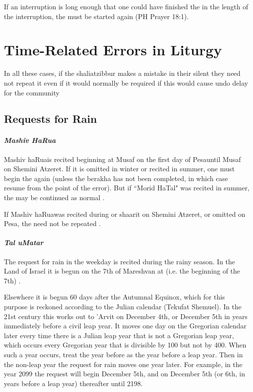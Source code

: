If an interruption is long enough that one could have finished the \amidah in the length of the interruption, the \amidah must be started again (PH Prayer 18:1).

\section{Time-Related Errors in Liturgy}

In all these cases, if the shalia\heth\space tzibbur makes a mistake in their silent \amidah they need not repeat it even if it would normally be required if this would cause undo delay for the community \parencite*[19:13]{Kitzur}

\subsection{Requests for Rain}

\paragraph{\textit{Mashiv HaRua\heth}}

Mashiv haRua\heth\space is recited beginning at Musaf on the first day of Pesa\heth\space until Musaf on Shemini Atzeret.  If it is omitted in winter or recited in summer, one must begin the \amidah again (unless the berakha has not been completed, in which case resume from the point of the error).  But if ``Morid HaTal" was recited in summer, the \amidah may be continued as normal \parencite*[18:4-5 citing OC 114]{PH}.

If Mashiv haRua\heth was recited during \arvit or sha\heth arit on Shemini Atzeret, or omitted on Pesa\heth , the \amidah need not be repeated \parencite*[19:2,4]{Kitzur}.

\paragraph{\textit{Tal uMatar}}

The request for rain in the weekday \amidah is recited during the rainy season.  In the Land of Israel it is begun on the 7th of Mar\heth eshvan at \arvit\space (i.e. the beginning of the 7th) \parencite*[18:5 citing OC 117]{PH}.

Elsewhere it is begun 60 days after the Autumnal Equinox, which for this purpose is reckoned according to the Julian calendar (Tekufat Shemuel).  In the 21st century this works out to 'Arvit on December 4th, or December 5th in years immediately before a civil leap year.  It moves one day on the Gregorian calendar later every time there is a Julian leap year that is not a Gregorian leap year, which occurs every Gregorian year that is divisible by 100 but not by 400. When such a year occurs, treat the year before as the year before a leap year.  Then in the non-leap year the request for rain moves one year later.  For example, in the year 2099 the request will begin December 5th, and on December 5th (or 6th, in years before a leap year) thereafter until 2198.

